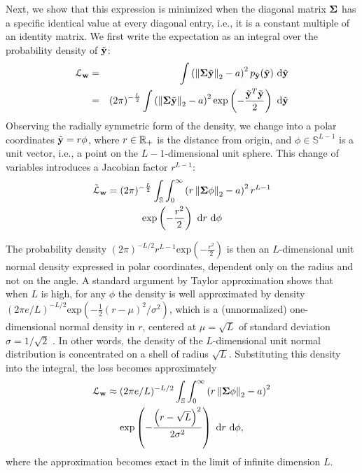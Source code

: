 Next, we show that this expression is minimized when the diagonal matrix ${\bf \Sigma}$ has a specific identical value at every diagonal entry, i.e., it is a constant multiple of an identity matrix. We first write the expectation as an integral over the probability density of $\tilde {\bf y}$:
\begin{eqnarray*}
	\mathcal{L}_{{\bf w}} &=& \int \left(\left\lVert {\bf \Sigma} \tilde {\bf y}\right\rVert_2 - a\right)^2 p_{\tilde {\bf y}}(\tilde {\bf y}) ~ \mathrm{d}\tilde {\bf y} \\
	&=& (2 \pi)^{-\frac{L}{2}} \int \left(\left\lVert {\bf \Sigma} \tilde {\bf y}\right\rVert_2 - a\right)^2 \mathrm{exp}\left(-\frac{\tilde {\bf y}^T \tilde {\bf y}}{2}\right) ~ \mathrm{d}\tilde {\bf y} 
\end{eqnarray*}
Observing the radially symmetric form of the density, we change into a polar coordinates $\tilde {\bf y} = r \phi$, where $r \in \mathbb{R}_+$ is the distance from origin, and $\phi \in \mathbb{S}^{L-1}$ is a unit vector, i.e., a point on the $L-1$-dimensional unit sphere. This change of variables introduces a Jacobian factor $r^{L-1}$:
\begin{multline*}
	\tilde{\mathcal{L}}_{{\bf w}} =
	(2 \pi)^{-\frac{L}{2}} \int_{\mathbb{S}}\int_0^\infty \left(r\left\lVert {\bf \Sigma} \phi \right\rVert_2 - a\right)^2 r^{L-1} \\
	\mathrm{exp}\left(-\frac{r^2}{2}\right) ~ \mathrm{d}r ~ \mathrm{d}\phi
\end{multline*}

The probability density $(2\pi)^{-L/2} r^{L-1} \mathrm{exp}\left(-\frac{r^2}{2}\right)$ is then an $L$-dimensional unit normal density expressed in polar coordinates, dependent only on the radius and not on the angle. A standard argument by Taylor approximation shows that when $L$ is high, for any $\phi$ the density is well approximated by density $(2\pi e / L)^{-L/2} \mathrm{exp}\left(-\frac{1}{2} (r-\mu)^2 / \sigma^2\right)$, which is a (unnormalized) one-dimensional normal density in $r$, centered at $\mu=\sqrt{L}$ of standard deviation $\sigma = 1/\sqrt{2}$ \cite{Bishop2006}. In other words, the density of the $L$-dimensional unit normal distribution is concentrated on a shell of radius $\sqrt{L}$. Substituting this density into the integral, the loss becomes approximately
\begin{multline}
	\mathcal{L}_{{\bf w}} \approx (2\pi e / L)^{-L/2} \int_{\mathbb{S}}\int_0^\infty  \left(r\left\lVert {\bf \Sigma} \phi \right\rVert_2 - a\right)^2 \\
	 \mathrm{exp}\left(-\frac{\left(r-\sqrt{L}\right)^2}{2 \sigma^2}\right) ~ \mathrm{d}r ~ \mathrm{d}\phi,
	\label{eq:gaussshell}
\end{multline}
where the approximation becomes exact in the limit of infinite dimension $L$.

